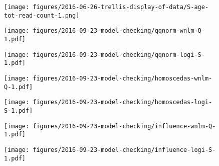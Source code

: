 \documentclass[letterpaper]{article}
\begin{document}
\begin{figure}
\begin{center}
\texttt{[image: figures/2016-06-26-trellis-display-of-data/S-age-tot-read-count-1.png]}
\end{center}
\caption{}
\label{fig:weight-of-evidence}
\end{figure}

\begin{figure}
\begin{center}
\texttt{[image: figures/2016-09-23-model-checking/qqnorm-wnlm-Q-1.pdf]}
\end{center}
\caption{}
\label{fig:qqnorm-wnlm.Q}
\end{figure}

\begin{figure}
\begin{center}
\texttt{[image: figures/2016-09-23-model-checking/qqnorm-logi-S-1.pdf]}
\end{center}
\caption{}
\label{fig:qqnorm-logi.S}
\end{figure}

\begin{figure}
\begin{center}
\texttt{[image: figures/2016-09-23-model-checking/homoscedas-wnlm-Q-1.pdf]}
\end{center}
\caption{}
\label{fig:homoscedas-wnlm.Q}
\end{figure}

\begin{figure}
\begin{center}
\texttt{[image: figures/2016-09-23-model-checking/homoscedas-logi-S-1.pdf]}
\end{center}
\caption{}
\label{fig:homoscedas-logi.S}
\end{figure}

\begin{figure}
\begin{center}
\texttt{[image: figures/2016-09-23-model-checking/influence-wnlm-Q-1.pdf]}
\end{center}
\caption{}
\label{fig:influence-wnlm.Q}
\end{figure}

\begin{figure}
\begin{center}
\texttt{[image: figures/2016-09-23-model-checking/influence-logi-S-1.pdf]}
\end{center}
\caption{}
\label{fig:influence-logi.S}
\end{figure}
\end{document}
